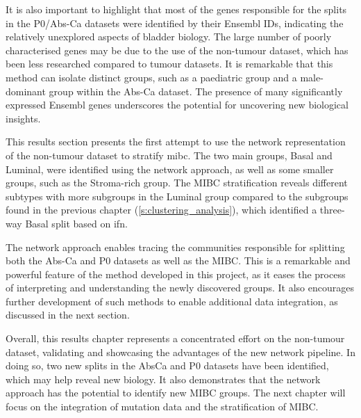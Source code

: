 It is also important to highlight that most of the genes responsible for the splits in the P0/Abs-Ca datasets were identified by their Ensembl IDs, indicating the relatively unexplored aspects of bladder biology. The large number of poorly characterised genes may be due to the use of the non-tumour dataset, which has been less researched compared to tumour datasets. It is remarkable that this method can isolate distinct groups, such as a paediatric group and a male-dominant group within the Abs-Ca dataset. The presence of many significantly expressed Ensembl genes underscores the potential for uncovering new biological insights.




This results section presents the first attempt to use the network representation of the non-tumour dataset to stratify \acrfull{mibc}. The two main groups, Basal and Luminal, were identified using the network approach, as well as some smaller groups, such as the Stroma-rich group. The MIBC stratification reveals different subtypes with more subgroups in the Luminal group compared to the subgroups found in the previous chapter (\cref{s:clustering_analysis}), which identified a three-way Basal split based on \acrfull{ifn}.

The network approach enables tracing the communities responsible for splitting both the Abs-Ca and P0 datasets as well as the MIBC. This is a remarkable and powerful feature of the method developed in this project, as it eases the process of interpreting and understanding the newly discovered groups. It also encourages further development of such methods to enable additional data integration, as discussed in the next section.

Overall, this results chapter represents a concentrated effort on the non-tumour dataset, validating and showcasing the advantages of the new network pipeline. In doing so, two new splits in the AbsCa and P0 datasets have been identified, which may help reveal new biology. It also demonstrates that the network approach has the potential to identify new MIBC groups. The next chapter will focus on the integration of mutation data and the stratification of MIBC.

